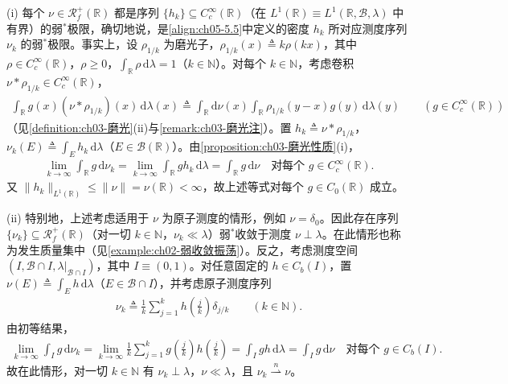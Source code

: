 \documentclass[../../main.tex]{subfiles}%
\begin{document}
\begin{example}\label{example:ch05-测度逼近}
\label{example:ch05-振荡集中}
(i) 每个 $\nu\in\mathscr{R}^+_f(\mathbb{R})$ 都是序列 $\{h_k\}\subseteq C^\infty_c(\mathbb{R})$（在 $L^1(\mathbb{R})\equiv L^1(\mathbb{R},\mathscr{B},\lambda)$ 中有界）的弱$^*$极限，确切地说，是\eqref{align:ch05-5.5}中定义的密度 $h_k$ 所对应测度序列 $\nu_k$ 的弱$^*$极限。事实上，设 $\rho_{1/k}$ 为磨光子，$\rho_{1/k}(x)\triangleq k\rho(kx)$，其中 $\rho\in C^\infty_c(\mathbb{R})$，$\rho\geqslant0$，$\int_\mathbb{R}\rho\,\mathrm{d}\lambda=1$（$k\in\mathbb{N}$）。对每个 $k\in\mathbb{N}$，考虑卷积 $\nu*\rho_{1/k}\in C^\infty_c(\mathbb{R})$，
\begin{align*}
\int_\mathbb{R}g(x)(\nu*\rho_{1/k})(x)\,\mathrm{d}\lambda(x)
\triangleq \int_\mathbb{R}\mathrm{d}\nu(x)\int_\mathbb{R}\rho_{1/k}(y-x)g(y)\,\mathrm{d}\lambda(y)
\qquad(g\in C^\infty_c(\mathbb{R}))
\end{align*}
（见\cref{definition:ch03-磨光}(ii)与\cref{remark:ch03-磨光注}）。置 $h_k\triangleq \nu*\rho_{1/k}$，$\nu_k(E)\triangleq \int_E h_k\,\mathrm{d}\lambda$（$E\in\mathscr{B}(\mathbb{R})$）。由\cref{proposition:ch03-磨光性质}(i)，
\begin{align*}
\lim_{k\to\infty}\int_\mathbb{R}g\,\mathrm{d}\nu_k
=\lim_{k\to\infty}\int_\mathbb{R}g h_k\,\mathrm{d}\lambda
=\int_\mathbb{R}g\,\mathrm{d}\nu
\quad\text{对每个 }g\in C^\infty_c(\mathbb{R}).
\end{align*}
又 $\|h_k\|_{L^1(\mathbb{R})}\leqslant\|\nu\|=\nu(\mathbb{R})<\infty$，故上述等式对每个 $g\in C_0(\mathbb{R})$ 成立。

(ii) 特别地，上述考虑适用于 $\nu$ 为原子测度的情形，例如 $\nu=\delta_0$。因此存在序列 $\{\nu_k\}\subseteq\mathscr{R}^+_f(\mathbb{R})$（对一切 $k\in\mathbb{N}$，$\nu_k\ll\lambda$）弱$^*$收敛于测度 $\nu\perp\lambda$。在此情形也称为发生质量集中（见\cref{example:ch02-弱收敛振荡}）。反之，考虑测度空间 $(I,\mathscr{B}\cap I,\lambda|_{\mathscr{B}\cap I})$，其中 $I\equiv(0,1)$。对任意固定的 $h\in C_b(I)$，置 $\nu(E)\triangleq \int_E h\,\mathrm{d}\lambda$（$E\in\mathscr{B}\cap I$），并考虑原子测度序列
\begin{align*}
\nu_k\triangleq \frac{1}{k}\sum_{j=1}^k h\!\left(\frac{j}{k}\right)\delta_{j/k}\qquad(k\in\mathbb{N}).
\end{align*}
由初等结果，
\begin{align*}
\lim_{k\to\infty}\int_I g\,\mathrm{d}\nu_k
=\lim_{k\to\infty}\frac{1}{k}\sum_{j=1}^k g\!\left(\frac{j}{k}\right)h\!\left(\frac{j}{k}\right)
=\int_I gh\,\mathrm{d}\lambda=\int_I g\,\mathrm{d}\nu
\quad\text{对每个 }g\in C_b(I).
\end{align*}
故在此情形，对一切 $k\in\mathbb{N}$ 有 $\nu_k\perp\lambda$，$\nu\ll\lambda$，且 $\nu_k\stackrel{n}{\rightharpoonup}\nu$。
\end{example}
\end{document}
